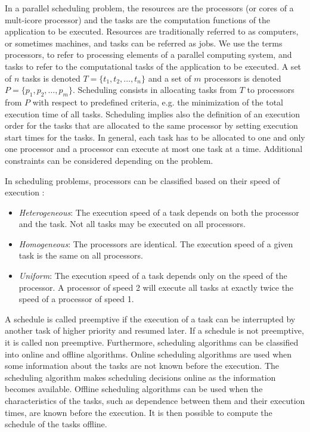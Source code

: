 In a parallel scheduling problem, the resources are the processors (or cores of a mult-icore processor) and the tasks are the computation functions of the application to be executed. Resources are traditionally referred to as computers, or sometimes machines, and tasks can be referred as jobs. We use the terms processors, to refer to processing elements of a parallel computing system, and tasks to refer to the computational tasks of the application to be executed. A set of $n$ tasks is denoted $T = \{t_1, t_2, \ldots, t_n\}$ and a set of $m$ processors is denoted $P = \{p_1, p_2, \ldots, p_m\}$. Scheduling consists in allocating tasks from $T$ to processors from $P$ with respect to predefined criteria, e.g. the minimization of the total execution time of all tasks. Scheduling implies also the definition of an execution order for the tasks that are allocated to the same processor by setting execution start times for the tasks. In general, each task has to be allocated to one and only one processor and a processor can execute at most one task at a time. Additional constraints can be considered depending on the problem.

In scheduling problems, processors can be classified based on their speed of execution \cite{davis:2011}:

\begin{itemize}
\item \textit{Heterogeneous}: The execution speed of a task depends on both the processor and the task. Not all tasks may be executed on all processors.
\item \textit{Homogeneous}: The processors are identical. The execution speed of a given task is the same on all processors.
\item \textit{Uniform}: The execution speed of a task depends only on the speed of the processor. A processor of speed 2 will execute all tasks at exactly twice the speed of a processor of speed 1.
\end{itemize}

A schedule is called preemptive if the execution of a task can be interrupted by another task of higher priority and resumed later. If a schedule is not preemptive, it is called non preemptive. Furthermore, scheduling algorithms can be classified into online and offline algorithms. Online scheduling algorithms are used when some information about the tasks are not known before the execution. The scheduling algorithm makes scheduling decisions online as the information becomes available. Offline scheduling algorithms can be used when the characteristics of the tasks, such as dependence between them and their execution times, are known before the execution. It is then possible to compute the schedule of the tasks offline.

